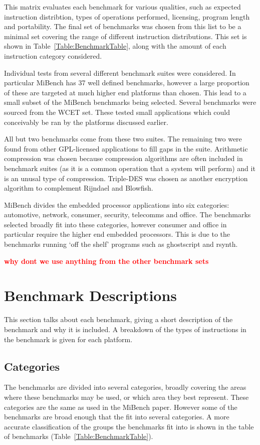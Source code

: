 \documentclass[twocolumn]{article}
\newcommand{\nsection}[1]{\section{\bfseries #1}}
\newcommand{\todo}[1]{\textbf{\textcolor{red}{#1}}}
\begin{document}
This matrix evaluates each benchmark for various qualities, such as expected instruction distribtion, types of operations performed, licensing, program length and portability. The final set of benchmarks was chosen from this list to be a minimal set covering the range of different instruction distributions. This set is shown in Table~\ref{Table:BenchmarkTable}, along with the amount of each instruction category considered.

Individual tests from several different benchmark suites were considered. In particular MiBench has 37 well defined benchmarks, however a large proportion of these are targeted at much higher end platforms than chosen. This lead to a small subset of the MiBench benchmarks being selected. Several benchmarks were sourced from the WCET set. These tested small applications which could conceivably be ran by the platforms discussed earlier.

All but two benchmarks come from these two suites. The remaining two were found from other GPL-licensed applications to fill gaps in the suite. Arithmetic compression was chosen because compression algorithms are often included in benchmark suites (as it is a common operation that a system will perform) and it is an unusal type of compression. Triple-DES was chosen as another encryption algorithm to complement Rijndael and Blowfish.

MiBench divides the embedded processor applications into six categories: automotive, network, consumer, security, telecomms and office. The benchmarks selected broadly fit into these categories, however consumer and office in particular require the higher end embedded processors. This is due to the benchmarks running `off the shelf' programs such as ghostscript and rsynth.

\todo{why dont we use anything from the other benchmark sets}

\nsection{Benchmark Descriptions}

This section talks about each benchmark, giving a short description of the benchmark and why it is included. A breakdown of the types of instructions in the benchmark is given for each platform.

\subsection*{Categories}

The benchmarks are divided into several categories, broadly covering the areas where these benchmarks may be used, or which area they best represent. These categories are the same as used in the MiBench paper. However some of the benchmarks are broad enough that the fit into several categories. A more accurate classification of the groups the benchmarks fit into is shown in the table of benchmarks (Table~\ref{Table:BenchmarkTable}).
\end{document}
